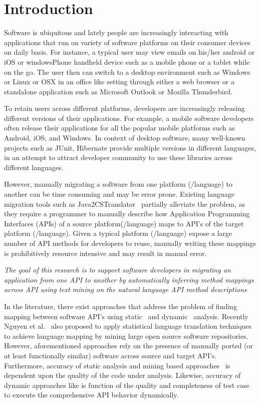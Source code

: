 \section{Introduction}
\label{sec:introduction}


Software is ubiquitous and lately people are increasingly interacting with applications
that run on variety of software platforms on their consumer devices on daily basis.
For instance, a typical user may view emails on his/her android or iOS or windowsPhone handheld
device such as a mobile phone or a tablet while on the go. 
The user then can switch to a desktop environment such as Windows or Linux or OSX 
in an office like setting through either a web browser or 
a standalone application such as Microsoft Outlook or Mozilla Thunderbird.


To retain users across different platforms,
developers are increasingly releasing different versions of their applications.
For example, a mobile software developers often release their applications
for all the popular mobile platforms such as Android, iOS, and Windows.
In context of desktop software, many well-known projects such as JUnit,
Hibernate provide multiple versions in different languages,
in an attempt to attract developer community to use these
libraries across different languages.


However, manually migrating a software from one platform (/language) to another
can be time consuming and may be error prone.
Existing language migration tools such as Java2CSTranslator~\cite{java2cstranslator}
partially alleviate the problem, as they require a programmer to manually describe how Application Programming Interfaces (APIs) of a source platform(/language) maps to API's of the target platform (/language). 
Given a typical platform (/language) expose a large number of API methods for developers to reuse, manually writing these mappings is prohibitively resource intensive and may result in manual error.


\textit{The goal of this research is to support software developers 
in migrating an application from one API to another
by automatically inferring method mappings across API using text mining
on the natural language API method descriptions}


In the literature, there exist approaches that address the problem of finding mapping between  software API's using static~\cite{Zhong2010ICSE} and dynamic~\cite{Gokhale2013ICSE} analysis. 
Recently Nguyen et al.~\cite{nguyen2014statistical} also proposed to apply statistical language translation techniques to achieve language mapping by mining large open source software repositories.  
However, aforementioned approaches rely on the presence of manually ported (or at least functionally similar) software across source and target API's.
Furthermore, accuracy of static analysis and mining based approaches~\cite{Zhong2010ICSE,nguyen2014statistical} is dependent upon the quality of the code under analysis.
Likewise, accuracy of dynamic approaches like \cite{Gokhale2013ICSE} is function of the quality and completeness of test case to execute the comprehensive API behavior dynamically. 


